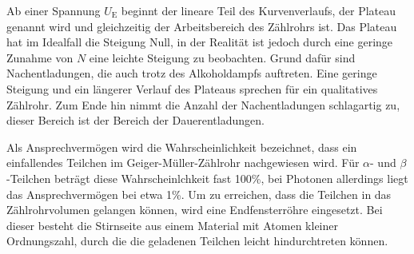 Ab einer Spannung $U_{\text{E}}$ beginnt der lineare Teil des Kurvenverlaufs, der Plateau genannt wird und gleichzeitig der Arbeitsbereich des Zählrohrs ist. Das Plateau hat im Idealfall die Steigung Null, in der Realität ist jedoch durch eine geringe Zunahme 
von $N$ eine leichte Steigung zu beobachten. Grund dafür sind Nachentladungen, die auch trotz des Alkoholdampfs auftreten. Eine geringe Steigung und ein längerer Verlauf des Plateaus sprechen für ein qualitatives Zählrohr. Zum Ende hin nimmt die Anzahl der 
Nachentladungen schlagartig zu, dieser Bereich ist der Bereich der Dauerentladungen. 

Als Ansprechvermögen wird die Wahrscheinlichkeit bezeichnet, dass ein einfallendes Teilchen im Geiger-Müller-Zählrohr nachgewiesen wird. Für $\alpha$- und $\beta$-Teilchen beträgt diese Wahrscheinlchkeit fast 100\%, bei Photonen allerdings liegt das
Ansprechvermögen bei etwa 1\%. Um zu erreichen, dass die Teilchen in das Zählrohrvolumen gelangen können, wird eine Endfensterröhre eingesetzt. Bei dieser besteht die Stirnseite aus einem Material mit Atomen kleiner Ordnungszahl, durch die die geladenen Teilchen 
leicht hindurchtreten können. 